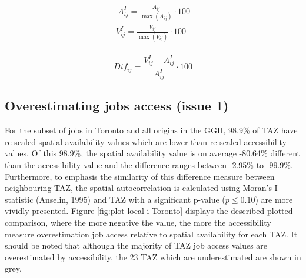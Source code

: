 \documentclass[]{elsarticle} %
\begin{document}
\begin{equation}
\label{eq:index-measures}
\begin{array}{l}\
A^I_{ij} = \frac{A_{ij}}{\max(A_{ij})}\cdot100\\
V^I_{ij} = \frac{V_{ij}}{\max(V_{ij})}\cdot100\\
\end{array}
\end{equation}

\begin{equation}
\label{eq:dif-index-measures}
Dif_{ij} = \frac{V^I_{ij} - A^I_{ij}}{A^I_{ij}}\cdot100
\end{equation}

\hypertarget{overestimating-jobs-access-issue-1}{%
\subsection{Overestimating jobs access (issue
1)}\label{overestimating-jobs-access-issue-1}}

For the subset of jobs in Toronto and all origins in the GGH, 98.9\% of
TAZ have re-scaled spatial availability values which are lower than
re-scaled accessibility values. Of this 98.9\%, the spatial availability
value is on average -80.64\% different than the accessibility value and
the difference ranges between -2.95\% to -99.9\%. Furthermore, to
emphasis the similarity of this difference measure between neighbouring
TAZ, the spatial autocorrelation is calculated using Moran's I statistic
(Anselin, 1995) and TAZ with a significant p-value (\(p\le 0.10\)) are
more vividly presented. Figure \ref{fig:plot-local-i-Toronto} displays
the described plotted comparison, where the more negative the value, the
more the accessibility measure overestimation job access relative to
spatial availability for each TAZ. It should be noted that although the
majority of TAZ job access values are overestimated by accessibility,
the 23 TAZ which are underestimated are shown in grey.
\end{document}
